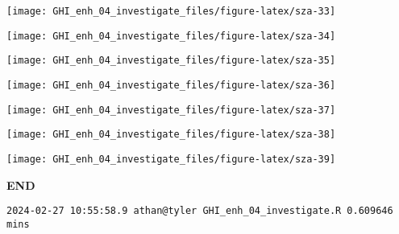 \documentclass[
  10pt,
  a4paper,oneside]{article}
\begin{document}
\begin{center}\texttt{[image: GHI\_enh\_04\_investigate\_files/figure-latex/sza-33]} \end{center}

\begin{center}\texttt{[image: GHI\_enh\_04\_investigate\_files/figure-latex/sza-34]} \end{center}

\begin{center}\texttt{[image: GHI\_enh\_04\_investigate\_files/figure-latex/sza-35]} \end{center}

\begin{center}\texttt{[image: GHI\_enh\_04\_investigate\_files/figure-latex/sza-36]} \end{center}

\begin{center}\texttt{[image: GHI\_enh\_04\_investigate\_files/figure-latex/sza-37]} \end{center}

\begin{center}\texttt{[image: GHI\_enh\_04\_investigate\_files/figure-latex/sza-38]} \end{center}

\begin{center}\texttt{[image: GHI\_enh\_04\_investigate\_files/figure-latex/sza-39]} \end{center}

\textbf{END}

\begin{verbatim}
2024-02-27 10:55:58.9 athan@tyler GHI_enh_04_investigate.R 0.609646 mins
\end{verbatim}
\end{document}
